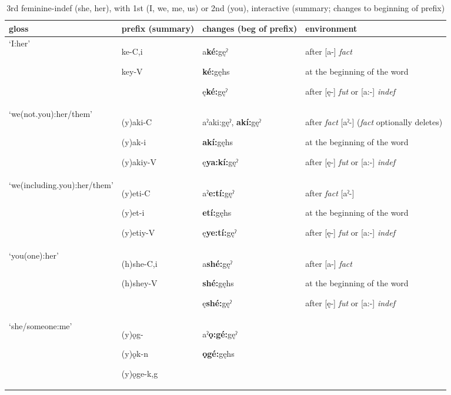 \begin{table}
\caption{3rd feminine-indef (she, her), with 1st (I, we, me, us) or 2nd (you), interactive (summary; changes to beginning of prefix)}
\label{tab:1:31pron}
\tiny{
\begin{tabularx}{\textwidth}{XXXX}
\lsptoprule
gloss & prefix (summary) & changes (beg of prefix) & environment\\
\midrule
‘I:her’ & ke-C,i

key-V & a\textbf{ké:}gęˀ

\textbf{ké:}gęhs

ę\textbf{ké:}gęˀ & after [a-] \textit{fact}

at the beginning of the word 

after [ę-] \textit{fut} or [a:-] \textit{indef}\\
‘we(not.you):her/them’ & (y)aki-C

(y)ak-i

(y)akiy-V & aˀaki:gęˀ, \textbf{akí:}gęˀ

\textbf{akí:}gęhs

ę\textbf{ya:kí:}gęˀ & after \textit{fact} [aˀ-] (\textit{fact} optionally deletes)

at the beginning of the word 

after [ę-] \textit{fut} or [a:-] \textit{indef}\\
‘we(including.you):her/them’ & (y)eti-C

(y)et-i

(y)etiy-V & aˀ\textbf{e:tí:}gęˀ

\textbf{etí:}gęhs

ę\textbf{ye:tí:}gęˀ & after \textit{fact} [aˀ-] 

at the beginning of the word 

after [ę-] \textit{fut} or [a:-] \textit{indef}\\
‘you(one):her’ & (h)she-C,i

(h)shey-V & a\textbf{shé:}gęˀ

\textbf{shé:}gęhs

ę\textbf{shé:}gęˀ & after [a-] \textit{fact}

at the beginning of the word 

after [ę-] \textit{fut} or [a:-] \textit{indef}\\
‘she/someone:me’ & (y)ǫg-

(y)ǫk-n

(y)ǫge-k,g & aˀ\textbf{ǫ:gé:}gęˀ

\textbf{ǫgé:}gęhs


\end{tabularx}}
\end{table}
